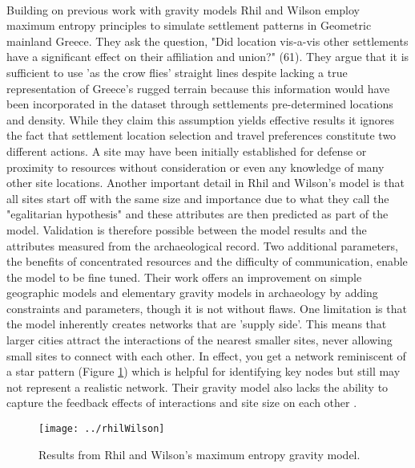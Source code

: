 \documentclass[12pt,a4paper]{thesis}
\begin{document}
\paragraph{}
Building on previous work with gravity models Rhil and Wilson \citeyearpar{RihWil91} employ maximum entropy principles to simulate settlement patterns in Geometric mainland Greece. They ask the question, "Did location vis-a-vis other settlements have a significant effect on their affiliation and union?" (61). They argue that it is sufficient to use 'as the crow flies' straight lines despite lacking a true representation of Greece's rugged terrain because this information would have been incorporated in the dataset through settlements pre-determined locations and density. While they claim this assumption yields effective results it ignores the fact that settlement location selection and travel preferences constitute two different actions. A site may have been initially established for defense or proximity to resources without consideration or even any knowledge of many other site locations. Another important detail in Rhil and Wilson's model is that all sites start off with the same size and importance due to what they call the "egalitarian hypothesis" and these attributes are then predicted as part of the model. Validation is therefore possible between the model results and the attributes measured from the archaeological record. Two additional parameters, the benefits of concentrated resources and the difficulty of communication, enable the model to be fine tuned.   Their work offers an improvement on simple geographic models and elementary gravity models in archaeology by adding constraints and parameters, though it is not without flaws.  One limitation is that the model inherently creates networks that are 'supply side'. This means that larger cities attract the interactions of the nearest smaller sites, never allowing small sites to connect with each other. In effect, you get a network reminiscent of a star pattern (Figure \ref{fig:rhilWilson}) which is helpful for identifying key nodes but still may not represent a realistic network. Their gravity model also lacks the ability to capture the feedback effects of interactions and site size on each other \cite[10]{KnaEvaRiv08}.

\begin{figure}
\centering
\texttt{[image: ../rhilWilson]}
\caption{Results from Rhil and Wilson's maximum entropy gravity model.}
\label{fig:rhilWilson}
\end{figure}
\end{document}
